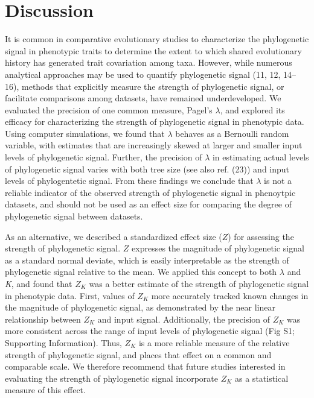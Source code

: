 \documentclass[9pt,twocolumn,twoside,lineno]{pnas-new}
\begin{document}
\hypertarget{discussion}{%
\section{Discussion}\label{discussion}}

It is common in comparative evolutionary studies to characterize the
phylogenetic signal in phenotypic traits to determine the extent to
which shared evolutionary history has generated trait covariation among
taxa. However, while numerous analytical approaches may be used to
quantify phylogenetic signal (11, 12, 14--16), methods that explicitly
measure the strength of phylogenetic signal, or facilitate comparisons
among datasets, have remained underdeveloped. We evaluated the precision
of one common measure, Pagel's \(\lambda\), and explored its efficacy
for characterizing the strength of phylogenetic signal in phenotypic
data. Using computer simulations, we found that \(\lambda\) behaves as a
Bernoulli random variable, with estimates that are increasingly skewed
at larger and smaller input levels of phylogenetic signal. Further, the
precision of \(\lambda\) in estimating actual levels of phylogenetic
signal varies with both tree size (see also ref. (23)) and input levels
of phylogentetic signal. From these findings we conclude that
\(\lambda\) is not a reliable indicator of the observed strength of
phylogenetic signal in phenoytpic datasets, and should not be used as an
effect size for comparing the degree of phylogenetic signal between
datasets.

As an alternative, we described a standardized effect size (\(Z\)) for
assessing the strength of phylogenetic signal. \(Z\) expresses the
magnitude of phylogenetic signal as a standard normal deviate, which is
easily interpretable as the strength of phylogenetic signal relative to
the mean. We applied this concept to both \(\lambda\) and \emph{K}, and
found that \(Z_K\) was a better estimate of the strength of phylogenetic
signal in phenotypic data. First, values of \(Z_K\) more accurately
tracked known changes in the magnitude of phylogenetic signal, as
demonstrated by the near linear relationship between \(Z_K\) and input
signal. Additionally, the precision of \(Z_K\) was more consistent
across the range of input levels of phylogenetic signal (Fig S1;
Supporting Information). Thus, \(Z_K\) is a more reliable measure of the
relative strength of phylogenetic signal, and places that effect on a
common and comparable scale. We therefore recommend that future studies
interested in evaluating the strength of phylogenetic signal incorporate
\(Z_K\) as a statistical measure of this effect.
\end{document}
